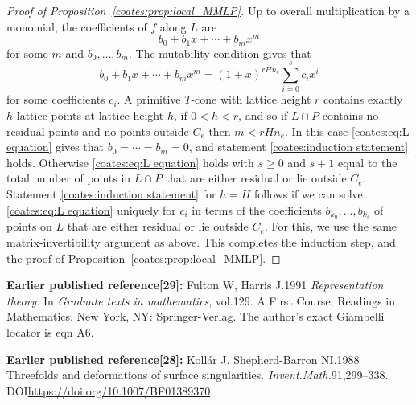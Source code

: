 \begin{proof}[Proof of Proposition~\ref{coates:prop:local_MMLP}]
  Up to overall multiplication by a monomial, the coefficients of $f$ along $L$ are
  \[
    b_0 + b_1 x + \cdots + b_m x^m  
  \]
  for some $m$ and $b_0,\ldots,b_m$. The mutability condition gives that 
  \begin{equation}
    \label{coates:eq:L equation}
    b_0 + b_1 x + \cdots + b_m x^m = 
    (1+x)^{r H n_e } \sum_{i=0}^s c_i x^i
  \end{equation}
  for some coefficients $c_i$. A primitive $T$-cone with lattice height $r$ contains exactly $h$ lattice points at lattice height $h$, if $0 < h < r$, and so if $L \cap P$ contains no residual points and no points outside $C_e$ then $m<r H n_e$. In this case \eqref{coates:eq:L equation} gives that $b_0 = \cdots = b_m = 0$, and statement \eqref{coates:induction statement} holds. Otherwise \eqref{coates:eq:L equation} holds with $s \geq 0$ and $s+1$ equal to the total number of points in $L \cap P$ that are either residual or lie outside $C_e$. Statement \eqref{coates:induction statement} for $h=H$ follows if we can solve \eqref{coates:eq:L equation} uniquely for $c_i$ in terms of the coefficients $b_{k_0}, \ldots, b_{k_s}$ of points on $L$ that are either residual or lie outside $C_e$. For this, we use the same matrix-invertibility argument as above. This completes the induction step, and the proof of Proposition~\ref{coates:prop:local_MMLP}.
\end{proof}
\medskip\noindent\textbf{Earlier published reference[29]:} Fulton W, Harris J.1991 \emph{Representation theory}. In \emph{Graduate texts in mathematics}, vol.129. A First Course, Readings in Mathematics. New York, NY: Springer-Verlag. The author's exact Giambelli locator is eqn A6.\par
\noindent\textbf{Earlier published reference[28]:} Koll\'ar J, Shepherd-Barron NI.1988 Threefolds and deformations of surface singularities. \emph{Invent.Math.}91,299--338. DOI\url{https://doi.org/10.1007/BF01389370}.\par
\endgroup

